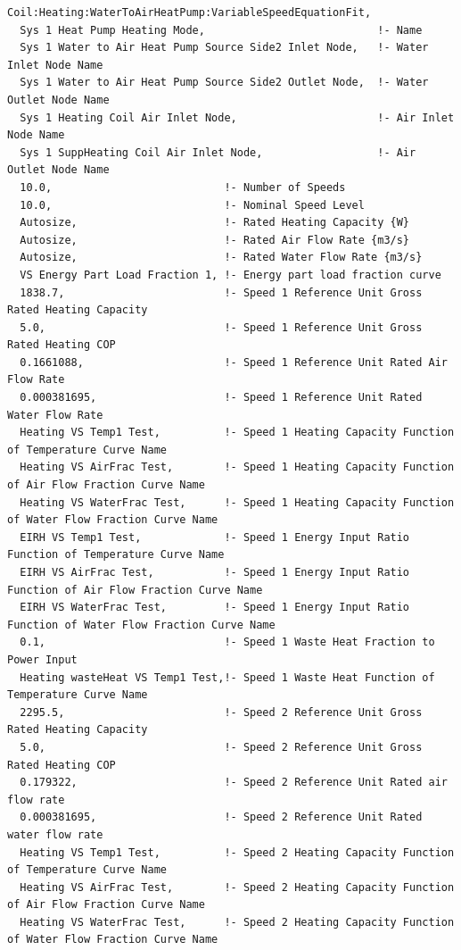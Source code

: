 \begin{lstlisting}
Coil:Heating:WaterToAirHeatPump:VariableSpeedEquationFit,
  Sys 1 Heat Pump Heating Mode,                           !- Name
  Sys 1 Water to Air Heat Pump Source Side2 Inlet Node,   !- Water Inlet Node Name
  Sys 1 Water to Air Heat Pump Source Side2 Outlet Node,  !- Water Outlet Node Name
  Sys 1 Heating Coil Air Inlet Node,                      !- Air Inlet Node Name
  Sys 1 SuppHeating Coil Air Inlet Node,                  !- Air Outlet Node Name
  10.0,                           !- Number of Speeds
  10.0,                           !- Nominal Speed Level
  Autosize,                       !- Rated Heating Capacity {W}
  Autosize,                       !- Rated Air Flow Rate {m3/s}
  Autosize,                       !- Rated Water Flow Rate {m3/s}
  VS Energy Part Load Fraction 1, !- Energy part load fraction curve
  1838.7,                         !- Speed 1 Reference Unit Gross Rated Heating Capacity
  5.0,                            !- Speed 1 Reference Unit Gross Rated Heating COP
  0.1661088,                      !- Speed 1 Reference Unit Rated Air Flow Rate
  0.000381695,                    !- Speed 1 Reference Unit Rated Water Flow Rate
  Heating VS Temp1 Test,          !- Speed 1 Heating Capacity Function of Temperature Curve Name
  Heating VS AirFrac Test,        !- Speed 1 Heating Capacity Function of Air Flow Fraction Curve Name
  Heating VS WaterFrac Test,      !- Speed 1 Heating Capacity Function of Water Flow Fraction Curve Name
  EIRH VS Temp1 Test,             !- Speed 1 Energy Input Ratio Function of Temperature Curve Name
  EIRH VS AirFrac Test,           !- Speed 1 Energy Input Ratio Function of Air Flow Fraction Curve Name
  EIRH VS WaterFrac Test,         !- Speed 1 Energy Input Ratio Function of Water Flow Fraction Curve Name
  0.1,                            !- Speed 1 Waste Heat Fraction to Power Input
  Heating wasteHeat VS Temp1 Test,!- Speed 1 Waste Heat Function of Temperature Curve Name
  2295.5,                         !- Speed 2 Reference Unit Gross Rated Heating Capacity
  5.0,                            !- Speed 2 Reference Unit Gross Rated Heating COP
  0.179322,                       !- Speed 2 Reference Unit Rated air flow rate
  0.000381695,                    !- Speed 2 Reference Unit Rated water flow rate
  Heating VS Temp1 Test,          !- Speed 2 Heating Capacity Function of Temperature Curve Name
  Heating VS AirFrac Test,        !- Speed 2 Heating Capacity Function of Air Flow Fraction Curve Name
  Heating VS WaterFrac Test,      !- Speed 2 Heating Capacity Function of Water Flow Fraction Curve Name

\end{lstlisting}
